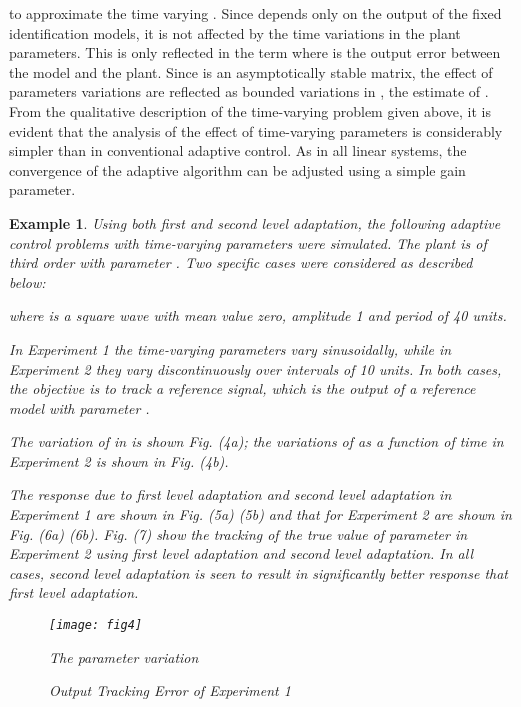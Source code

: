 \documentclass[conference]{IEEEtran}
\newtheorem{Example}{Example}
\begin{document}
to approximate the time varying . Since  depends only on the output of the fixed identification models, it is not affected by the time variations in the plant parameters. This is only reflected in the term  where  is the output error between the  model and the plant. Since  is an asymptotically stable matrix, the effect of  parameters variations are reflected as bounded variations in , the estimate of . From the qualitative description of the time-varying problem given above, it is evident that the analysis of the effect of time-varying parameters is considerably simpler than in conventional adaptive control. As in all linear systems, the convergence of the adaptive algorithm can be adjusted using a simple gain parameter.
\begin{Example}
Using both first and second level adaptation, the following adaptive control problems with time-varying parameters were simulated. The plant is of third order with parameter . Two specific cases were considered as described below:


where  is a square wave with mean value zero, amplitude 1 and period of 40 units.

In Experiment 1 the time-varying parameters vary sinusoidally, while in Experiment 2 they vary discontinuously over intervals of 10 units. In both cases, the objective is to track a reference signal, which is the output of a reference model with parameter .

The variation of  in  is shown Fig. (4a); the variations of  as a function of time in Experiment 2 is shown in Fig. (4b).

The response due to first level adaptation and second level adaptation in Experiment 1 are shown in Fig. (5a)  (5b) and that for Experiment 2 are shown in Fig. (6a)  (6b). Fig. (7) show the tracking of the true value of parameter  in Experiment 2 using first level adaptation and second level adaptation. In all cases, second level adaptation is seen to result in significantly better response that first level adaptation.

\begin{figure}[H]
  \centering
  \texttt{[image: fig4]}\\	
  \caption{The parameter variation}
  \label{Fig4}
\end{figure}

\begin{figure}[H]
\centering
{}
\caption{Output Tracking Error of Experiment 1}
\end{figure}


\end{Example}
\end{document}
